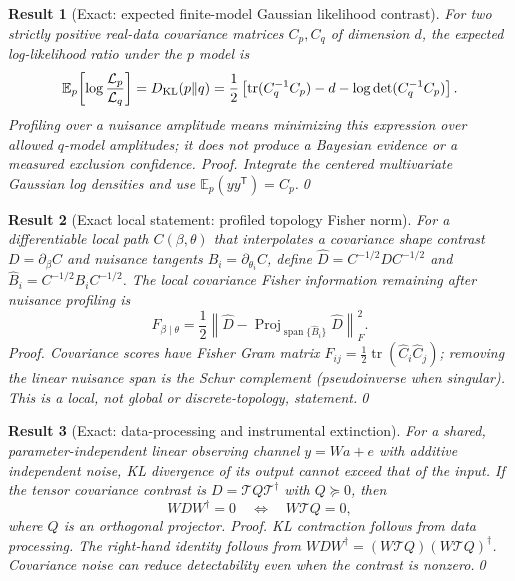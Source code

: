 \documentclass[aps,prd,onecolumn,notitlepage,groupedaddress,11pt]{revtex4-2}
\newtheorem{result}{Result}
\begin{document}
\begin{result}[\textsf{Exact}: expected finite-model Gaussian likelihood contrast]\label{new:213}
For two strictly positive real-data covariance matrices $C_p,C_q$ of dimension $d$, the expected log-likelihood ratio under the $p$ model is
\begin{equation}\label{eq:KLreal}
\mathbb E_p\!\left[\log\frac{\mathcal L_p}{\mathcal L_q}\right]
=D_{\rm KL}(p\Vert q)=\frac12\left[\operatorname{tr}(C_q^{-1}C_p)-d-\log\det(C_q^{-1}C_p)\right].
\end{equation}
Profiling over a nuisance amplitude means minimizing this expression over allowed $q$-model amplitudes; it does \emph{not} produce a Bayesian evidence or a measured exclusion confidence. \textit{Proof.} Integrate the centered multivariate Gaussian log densities and use $\mathbb E_p(yy^{\mathsf T})=C_p$.\qed
\end{result}

\begin{result}[\textsf{Exact local statement}: profiled topology Fisher norm]\label{new:214}
For a differentiable local path $C(\beta,\theta)$ that interpolates a covariance shape contrast $D=\partial_\beta C$ and nuisance tangents $B_i=\partial_{\theta_i}C$, define $\widehat D=C^{-1/2}DC^{-1/2}$ and $\widehat B_i=C^{-1/2}B_iC^{-1/2}$. The local covariance Fisher information remaining after nuisance profiling is
\begin{equation}\label{eq:multiFish}
F_{\beta\mid\theta}=\frac12\left\|\widehat D-\operatorname{Proj}_{\operatorname{span}\{\widehat B_i\}}\widehat D\right\|_F^2.
\end{equation}
\textit{Proof.} Covariance scores have Fisher Gram matrix $F_{ij}=\tfrac12\operatorname{tr}(\widehat C_i\widehat C_j)$; removing the linear nuisance span is the Schur complement (pseudoinverse when singular). This is a local, not global or discrete-topology, statement.\qed
\end{result}

\begin{result}[\textsf{Exact}: data-processing and instrumental extinction]\label{new:215}
For a shared, parameter-independent linear observing channel $y=W a+e$ with additive independent noise, KL divergence of its output cannot exceed that of the input. If the tensor covariance contrast is $D=\mathcal TQ\mathcal T^\dagger$ with $Q\succeq0$, then
\begin{equation}\label{eq:extinction}
WDW^\dagger=0\quad\Longleftrightarrow\quad W\mathcal TQ=0,
\end{equation}
where $Q$ is an orthogonal projector. \textit{Proof.} KL contraction follows from data processing. The right-hand identity follows from $WDW^\dagger=(W\mathcal TQ)(W\mathcal TQ)^\dagger$. Covariance noise can reduce detectability even when the contrast is nonzero.\qed
\end{result}
\end{document}
